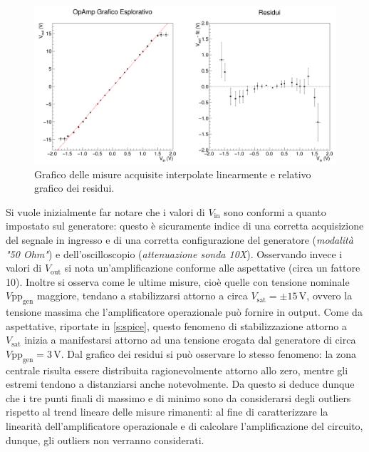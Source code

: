 \documentclass[a4paper,11pt]{article} %
\begin{document}
\begin{figure}[H]
	\centering
	\includegraphics[width=\linewidth]{../Plots/Report_Plots/opamp_plot_alldata_eda.png}
	\caption{\small Grafico delle misure acquisite interpolate linearmente e relativo grafico dei residui.}
	\label{i:opamp_eda}
\end{figure}

\noindent  Si vuole inizialmente far notare che i valori di $V_{\text{in}}$ sono conformi a quanto impostato sul
generatore: questo è sicuramente indice di una corretta acquisizione del segnale in ingresso e di una corretta
configurazione del generatore (\textit{modalità "50 Ohm"}) e dell'oscilloscopio (\textit{attenuazione sonda 10X}).
Osservando invece i valori di $V_{\text{out}}$ si nota un'amplificazione conforme alle aspettative (circa un fattore
10). Inoltre si osserva come le ultime misure, cioè quelle con tensione nominale $V\text{pp}_{\text{gen}}$ maggiore,
tendano a stabilizzarsi attorno a circa $V_{\text{sat}}=\pm15\,\si{\volt}$, ovvero la tensione massima che
l'amplificatore operazionale può fornire in output. Come da aspettative, riportate in \autoref{s:spice}, questo fenomeno
di stabilizzazione attorno a $V_{\text{sat}}$ inizia a manifestarsi attorno ad una tensione erogata dal generatore di
circa $V\text{pp}_{\text{gen}}=3\,\si{\volt}$. Dal grafico dei residui si può osservare lo stesso fenomeno: la zona
centrale risulta essere distribuita ragionevolmente attorno allo zero, mentre gli estremi tendono a distanziarsi anche
notevolmente. Da questo si deduce dunque che i tre punti finali di massimo e di minimo sono da considerarsi degli
outliers rispetto al trend lineare delle misure rimanenti: al fine di caratterizzare la linearità dell'amplificatore
operazionale e di calcolare l'amplificazione del circuito, dunque, gli outliers non verranno considerati.

\end{document}

